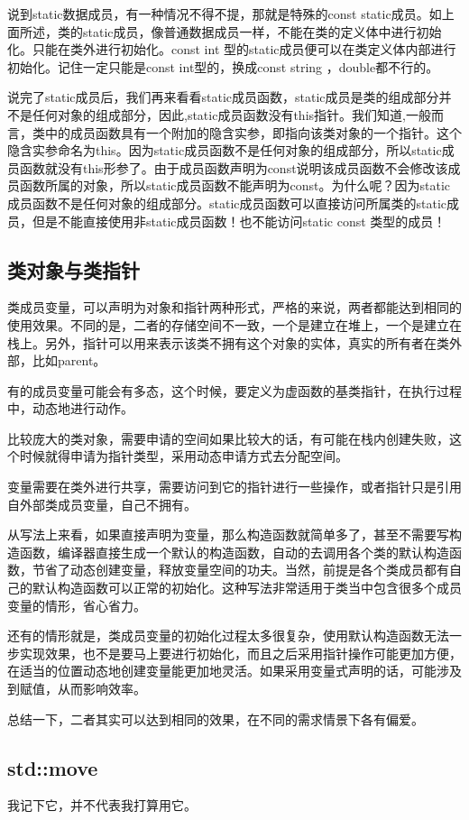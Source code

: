 说到static数据成员，有一种情况不得不提，那就是特殊的const static成员。如上面所述，类的static成员，像普通数据成员一样，不能在类的定义体中进行初始化。只能在类外进行初始化。const int 型的static成员便可以在类定义体内部进行初始化。记住一定只能是const int型的，换成const string ，double都不行的。

说完了static成员后，我们再来看看static成员函数，static成员是类的组成部分并不是任何对象的组成部分，因此,static成员函数没有this指针。我们知道,一般而言，类中的成员函数具有一个附加的隐含实参，即指向该类对象的一个指针。这个隐含实参命名为this。因为static成员函数不是任何对象的组成部分，所以static成员函数就没有this形参了。由于成员函数声明为const说明该成员函数不会修改该成员函数所属的对象，所以static成员函数不能声明为const。为什么呢？因为static成员函数不是任何对象的组成部分。static成员函数可以直接访问所属类的static成员，但是不能直接使用非static成员函数！也不能访问static const 类型的成员！
\subsection{类对象与类指针}
类成员变量，可以声明为对象和指针两种形式，严格的来说，两者都能达到相同的使用效果。不同的是，二者的存储空间不一致，一个是建立在堆上，一个是建立在栈上。另外，指针可以用来表示该类不拥有这个对象的实体，真实的所有者在类外部，比如parent。

有的成员变量可能会有多态，这个时候，要定义为虚函数的基类指针，在执行过程中，动态地进行动作。

比较庞大的类对象，需要申请的空间如果比较大的话，有可能在栈内创建失败，这个时候就得申请为指针类型，采用动态申请方式去分配空间。

变量需要在类外进行共享，需要访问到它的指针进行一些操作，或者指针只是引用自外部类成员变量，自己不拥有。

从写法上来看，如果直接声明为变量，那么构造函数就简单多了，甚至不需要写构造函数，编译器直接生成一个默认的构造函数，自动的去调用各个类的默认构造函数，节省了动态创建变量，释放变量空间的功夫。当然，前提是各个类成员都有自己的默认构造函数可以正常的初始化。这种写法非常适用于类当中包含很多个成员变量的情形，省心省力。

还有的情形就是，类成员变量的初始化过程太多很复杂，使用默认构造函数无法一步实现效果，也不是要马上要进行初始化，而且之后采用指针操作可能更加方便，在适当的位置动态地创建变量能更加地灵活。如果采用变量式声明的话，可能涉及到赋值，从而影响效率。

总结一下，二者其实可以达到相同的效果，在不同的需求情景下各有偏爱。
\subsection{std::move}
我记下它，并不代表我打算用它。

